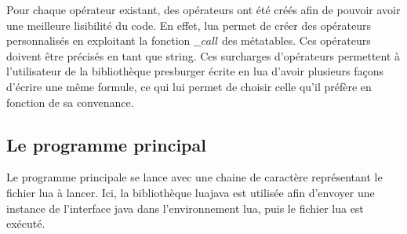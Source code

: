 Pour chaque opérateur existant, des opérateurs ont été créés afin de pouvoir avoir une meilleure lisibilité du code. En effet, lua permet de créer des opérateurs personnalisés en exploitant la fonction $\_\_call$ des métatables. Ces opérateurs doivent être précisés en tant que string. Ces surcharges d’opérateurs permettent à l’utilisateur de la bibliothèque presburger écrite en lua d’avoir plusieurs façons d’écrire une même formule, ce qui lui permet de choisir celle qu’il préfère en fonction de sa convenance. 

\subsection{Le programme principal}

Le programme principale se lance avec une chaine de caractère représentant le fichier lua à lancer. Ici, la bibliothèque luajava est utilisée afin d’envoyer une instance de l’interface java dans l’environnement lua, puis le fichier lua est exécuté.
